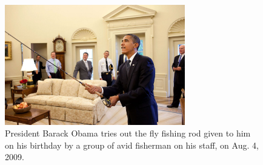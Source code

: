 \begin{figure}[!ht]
  \centering
  \includegraphics[width=0.7\textwidth]{images/President_Barack_Obama_tries_out_the_fly_fishing_rod_given_to_him_on_his_birthday_by_a_group_of_avid_fisherman_on_his_staff.jpg}
  \caption{President Barack Obama tries out the fly fishing rod given to him on his birthday by a group of avid fisherman on his staff, on Aug. 4, 2009.}
  \label{fig_barack_fishing}
\end{figure}
